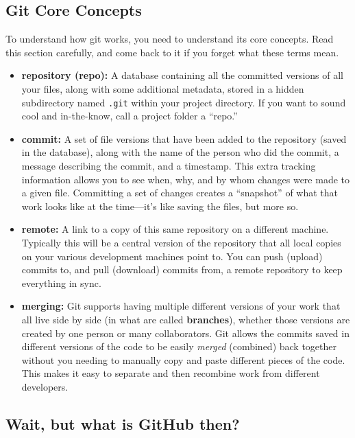 \documentclass[]{book}
\theoremstyle{definition}
\theoremstyle{definition}
\theoremstyle{remark}
\begin{document}
\subsection{Git Core Concepts}\label{git-core-concepts}

To understand how git works, you need to understand its core concepts.
Read this section carefully, and come back to it if you forget what
these terms mean.

\begin{itemize}
\item
  \textbf{repository (repo):} A database containing all the committed
  versions of all your files, along with some additional metadata,
  stored in a hidden subdirectory named \texttt{.git} within your
  project directory. If you want to sound cool and in-the-know, call a
  project folder a ``repo.''
\item
  \textbf{commit:} A set of file versions that have been added to the
  repository (saved in the database), along with the name of the person
  who did the commit, a message describing the commit, and a timestamp.
  This extra tracking information allows you to see when, why, and by
  whom changes were made to a given file. Committing a set of changes
  creates a ``snapshot'' of what that work looks like at the time---it's
  like saving the files, but more so.
\item
  \textbf{remote:} A link to a copy of this same repository on a
  different machine. Typically this will be a central version of the
  repository that all local copies on your various development machines
  point to. You can push (upload) commits to, and pull (download)
  commits from, a remote repository to keep everything in sync.
\item
  \textbf{merging:} Git supports having multiple different versions of
  your work that all live side by side (in what are called
  \textbf{branches}), whether those versions are created by one person
  or many collaborators. Git allows the commits saved in different
  versions of the code to be easily \emph{merged} (combined) back
  together without you needing to manually copy and paste different
  pieces of the code. This makes it easy to separate and then recombine
  work from different developers.
\end{itemize}

\subsection{Wait, but what is GitHub
then?}\label{wait-but-what-is-github-then}
\end{document}
